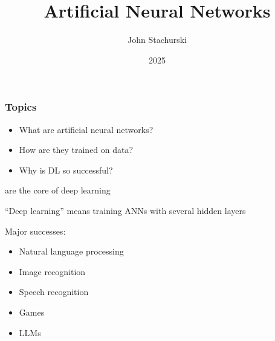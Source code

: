 


\title{Artificial Neural Networks}

\author{John Stachurski}


\date{2025}




\begin{frame}
  \titlepage
\end{frame}



\begin{frame}
    \frametitle{Topics}

    \begin{itemize}
        \item What are artificial neural networks?
        \vspace{0.5em}
        \item How are they trained on data?
        \vspace{0.5em}
        \item Why is DL so successful?
        \vspace{0.5em}
    \end{itemize}

\end{frame}


\begin{frame}
    
     are the core of deep learning

        \vspace{0.5em}
    ``Deep learning'' means training ANNs with several hidden layers

        \vspace{0.5em}
    Major successes:
    \begin{itemize}
        \item Natural language processing
        \vspace{0.3em}
        \item Image recognition
        \vspace{0.3em}
        \item Speech recognition
        \vspace{0.3em}
        \item Games
        \vspace{0.3em}
        \item LLMs
    \end{itemize}

\end{frame}

